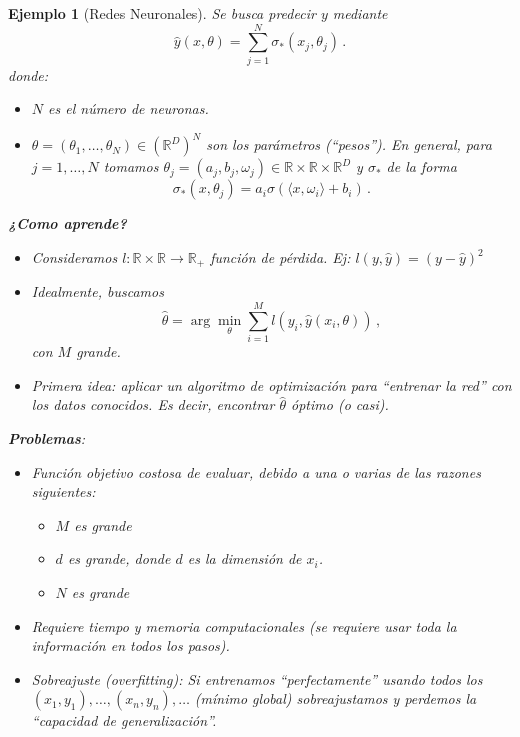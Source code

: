 \documentclass[letterpaper,11pt]{article} %
\theoremstyle{defbreak}
\newtheorem{example}{Ejemplo}[subsection]
\theoremstyle{propbreak}
\theoremstyle{remark}
\theoremstyle{break}
\def\R{\mathbb{R}}
\def\samples{(x_1,y_1),\dots,(x_n,y_n),\dots}
\begin{document}
\begin{example}[Redes Neuronales]
\label{ejemplo:red_neuronal}
Se busca predecir $y$ mediante
$$ \hat{y}(x,\theta) = \displaystyle\sum^N_{j=1}\sigma_*(x_j,\theta_j) \,.$$
donde:
\begin{itemize}
    \item $N$ es el número de neuronas.
    \item $\theta=(\theta_1,\dots,\theta_N)\in(\R^D)^N$ son los parámetros (``pesos'').
    \newline En general, para $j=1,\dots,N$ tomamos $\theta_j=(a_j,b_j,\omega_j)\in \R\times\R\times\R^D $ y $\sigma_*$ de la forma
    $$ \sigma_*(x,\theta_j)=a_i\sigma(\langle x,\omega_i\rangle+b_i) \,.$$
\end{itemize}
\textbf{¿Como aprende?}
\begin{itemize}
    \item Consideramos $l:\R\times\R\to\R_+$ función de pérdida.
    \newline Ej: $l(y,\hat{y})=(y-\hat{y})^2$
    \item Idealmente, buscamos
    $$ \hat{\theta}=\displaystyle\arg\min_\theta \sum^M_{i=1}l(y_i,\hat{y}(x_i,\theta))\,,$$
    con $M$ grande.
    \item Primera idea: aplicar un algoritmo de optimización para ``entrenar la red'' con los datos conocidos. Es decir, encontrar $\hat{\theta}$ óptimo (o casi).
\end{itemize}
\textbf{Problemas}:
\begin{itemize}
    \item Función objetivo costosa de evaluar, debido a una o varias de las razones siguientes:
    \begin{itemize}
        \item $M$ es grande
        \item $d$ es grande, donde $d$ es la dimensión de $x_i$.
        \item $N$ es grande
    \end{itemize}
    \item Requiere tiempo y memoria computacionales (se requiere usar toda la información en todos los pasos).
    \item Sobreajuste (overfitting): Si entrenamos ``perfectamente'' usando todos los $\samples$ (mínimo global) sobreajustamos y perdemos la ``capacidad de generalización''.

\end{itemize}
\end{example}
\end{document}
